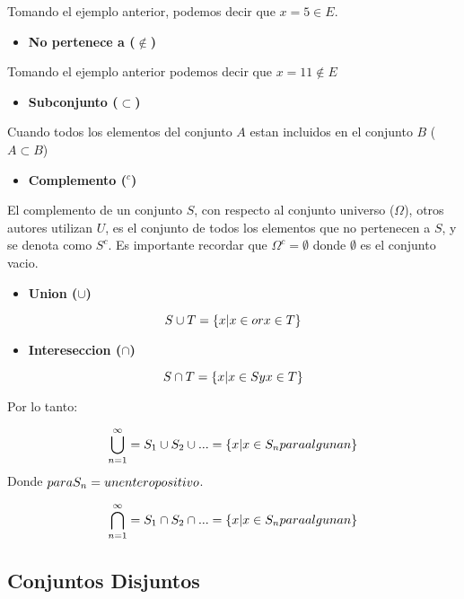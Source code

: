 \documentclass[]{book}
\providecommand{\tightlist}{%
  \setlength{\itemsep}{0pt}\setlength{\parskip}{0pt}}
\begin{document}
Tomando el ejemplo anterior, podemos decir que \(x = 5 \in E\).

\begin{itemize}
\tightlist
\item
  \textbf{No pertenece a (\(\notin\))}
\end{itemize}

Tomando el ejemplo anterior podemos decir que \(x = 11 \notin E\)

\begin{itemize}
\tightlist
\item
  \textbf{Subconjunto (\(\subset\))}
\end{itemize}

Cuando todos los elementos del conjunto \(A\) estan incluidos en el
conjunto \(B\) (\(A \subset B\))

\begin{itemize}
\tightlist
\item
  \textbf{Complemento (\(^c\))}
\end{itemize}

El complemento de un conjunto \(S\), con respecto al conjunto universo
(\(\Omega\)), otros autores utilizan \(U\), es el conjunto de todos los
elementos que no pertenecen a \(S\), y se denota como \(S^c\). Es
importante recordar que \(\Omega^c = \emptyset\) donde \(\emptyset\) es
el conjunto vacio.

\begin{itemize}
\tightlist
\item
  \textbf{Union (\(\cup\))}
\end{itemize}

\[S \cup T = \{x|x \in or\space x\in T\}\]

\begin{itemize}
\tightlist
\item
  \textbf{Intereseccion (\(\cap\))}
\end{itemize}

\[S \cap T = \{x|x \in S\space y \space x \in T \} \]

 Por lo tanto:

\[\bigcup_{n=1}^{\infty}= S_1 \cup S_2 \cup ...= \{ x|x \in S_n para \space alguna\space n\} \]
Donde \(para\space S_n = \space un \space entero \space positivo\).

\[ \bigcap_{n=1}^{\infty} = S_1 \cap S_2 \cap ... = \{ x|x \in S_n \space para \space alguna \space n\}\]

\subsection{Conjuntos Disjuntos}\label{conjuntos-disjuntos-1}
\end{document}
